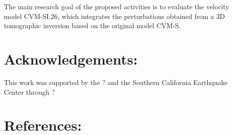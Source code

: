 \documentclass[10pt]{article}
\begin{document}
The main research goal of the proposed activities is to evaluate the velocity model CVM-SI.26, which integrates the
perturbations obtained from a 3D tomographic inversion based on the original model CVM-S.

\section{Acknowledgements: }

This work was supported by the ? and the Southern California Earthquake Center through ?

\section{References:}
\end{document}
